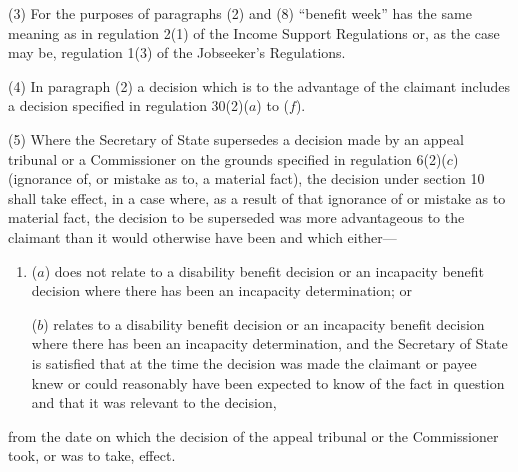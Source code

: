\documentclass[12pt,a4paper]{article}
\begin{document}
(3) For the purposes of paragraphs (2) and (8) “benefit week” has the same meaning as in regulation 2(1) of the Income Support Regulations or, as the case may be, regulation 1(3) of the Jobseeker’s Regulations.

(4) In paragraph (2) a decision which is to the advantage of the claimant includes a decision specified in regulation 30(2)($a$) to ($f$).

%

(5) Where the Secretary of State supersedes a decision made by an appeal tribunal or a Commissioner on the grounds specified in regulation 6(2)($c$)  (ignorance of, or mistake as to, a material fact), the decision under section 10 shall take effect, in a case where, as a result of that ignorance of or mistake as to material fact, the decision to be superseded was more advantageous to the claimant than it would otherwise have been and which either—
\begin{enumerate}\item[]
($a$) does not relate to a disability benefit decision or an incapacity benefit decision where there has been an incapacity determination; or

($b$) relates to a disability benefit decision or an incapacity benefit decision where there has been an incapacity determination, and the Secretary of State is satisfied that at the time the decision was made the claimant or payee knew or could reasonably have been expected to know of the fact in question and that it was relevant to the decision,
\end{enumerate}
from the date on which the decision of the appeal tribunal or the Commissioner took, or was to take, effect.
\end{document}
